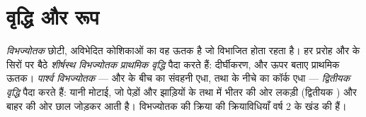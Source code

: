 \section{वृद्धि और रूप}

\begin{definition}[विभज्योतक, प्राथमिक और द्वितीयक वृद्धि]\label{def:b1:flowering-plant-organization:meristem}
\emph{विभज्योतक} छोटी, अविभेदित कोशिकाओं का वह ऊतक है
जो विभाजित होता रहता है। हर प्ररोह और  के सिरों पर बैठे
\emph{शीर्षस्थ विभज्योतक} \emph{प्राथमिक
वृद्धि} पैदा करते हैं: दीर्घीकरण, और ऊपर बताए
प्राथमिक ऊतक। \emph{पार्श्व विभज्योतक} ---
 और  के बीच का संवहनी एधा, तथा  के नीचे का कॉर्क एधा
--- \emph{द्वितीयक वृद्धि} पैदा करते हैं: यानी
मोटाई, जो पेड़ों और झाड़ियों के  तथा  में भीतर की ओर लकड़ी
(द्वितीयक ) और बाहर की ओर छाल जोड़कर आती है। विभज्योतक की क्रिया की
क्रियाविधियाँ वर्ष 2 के खंड की हैं।
\end{definition}

